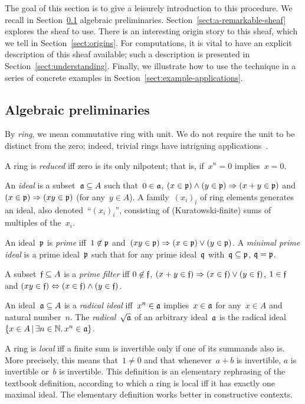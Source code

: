 \documentclass{ws-rv9x6}
\begin{document}
{The goal of this section is to give a leisurely introduction to this procedure.
We recall in Section~\ref{sect:algebraic-preliminaries} algebraic
preliminaries. Section~\ref{sect:a-remarkable-sheaf} explores the sheaf to use.
There is an interesting origin story to this sheaf, which we tell in
Section~\ref{sect:origins}. For computations, it is vital to have an explicit
description of this sheaf available; such a description is presented in
Section~\ref{sect:understanding}. Finally, we illustrate how to use the technique in
a series of concrete examples in Section~\ref{sect:example-applications}.


\subsection{Algebraic preliminaries}
\label{sect:algebraic-preliminaries}

By \emph{ring}, we mean commutative ring with unit. We do not require the unit
to be distinct from the zero; indeed, trivial rings have intriguing
applications~\cite{richman:trivial-rings}.

A ring is \emph{reduced} iff zero is its only nilpotent; that is, if~$x^n = 0$
implies~$x = 0$.

An \emph{ideal} is a subset~$\mathfrak{a} \subseteq A$ such that~$0 \in \mathfrak{a}$, $(x \in
\mathfrak{p}) \wedge (y \in \mathfrak{p}) \Rightarrow (x + y \in \mathfrak{p})$ and $(x \in
\mathfrak{p}) \Rightarrow (xy \in \mathfrak{p})$ (for any~$y \in A$). A family~$(x_i)_i$ of
ring elements generates an ideal, also denoted~``$(x_i)_i$'', consisting of
(Kuratowski-finite) sums of multiples of the~$x_i$.

An ideal~$\mathfrak{p}$ is \emph{prime} iff~$1 \not\in \mathfrak{p}$ and~$(xy
\in \mathfrak{p}) \Rightarrow (x \in \mathfrak{p}) \vee (y \in \mathfrak{p})$.
A \emph{minimal prime ideal} is a prime ideal~$\mathfrak{p}$ such that for any prime
ideal~$\mathfrak{q}$ with~$\mathfrak{q} \subseteq \mathfrak{p}$, $\mathfrak{q} = \mathfrak{p}$.

A subset~$\mathfrak{f} \subseteq A$ is a \emph{prime filter} iff
$0 \not\in \mathfrak{f}$, $(x + y \in \mathfrak{f}) \Rightarrow (x \in \mathfrak{f}) \vee (y \in
\mathfrak{f})$, $1 \in \mathfrak{f}$ and $(xy \in \mathfrak{f}) \Leftrightarrow (x \in \mathfrak{f}) \wedge (y
\in \mathfrak{f})$.

An ideal~$\mathfrak{a} \subseteq A$ is a \emph{radical ideal} iff~$x^n \in \mathfrak{a}$
implies~$x \in \mathfrak{a}$ for any~$x \in A$ and natural number~$n$. The
\emph{radical}~$\sqrt{\mathfrak{a}}$ of an arbitrary ideal~$\mathfrak{a}$ is the radical
ideal~$\{ x \in A \,|\, \exists n \in \mathbb{N}\mathpunct{.} x^n \in \mathfrak{a} \}$.

A ring is \emph{local} iff a finite sum is invertible only if one of its
summands also is. More precisely, this means that~$1 \neq 0$ and that
whenever~$a + b$ is invertible, $a$ is invertible or~$b$ is invertible.
This definition is an elementary rephrasing of the textbook definition,
according to which a ring is local iff it has exactly one maximal ideal. The
elementary definition works better in constructive contexts.

}
\end{document}
